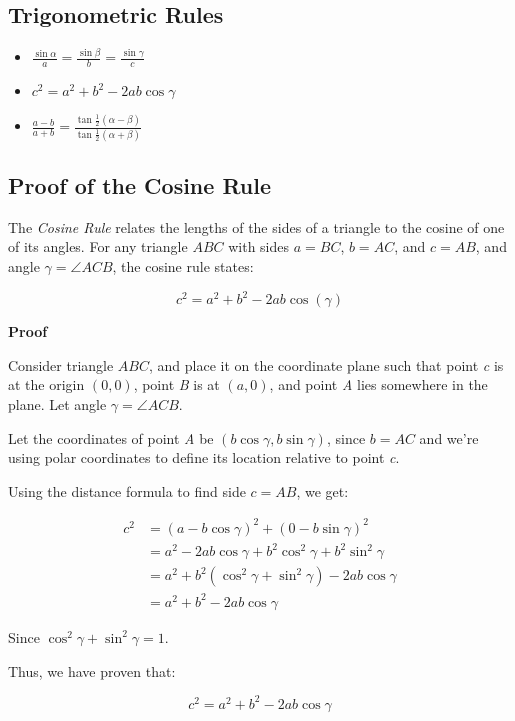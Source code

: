 \subsection{Trigonometric Rules}

\begin{itemize}

    \item \(\frac{\sin \alpha}{a} = \frac{\sin \beta}{b} = \frac{\sin \gamma}{c}\)

    \item \(c^2 = a^2 + b^2 - 2ab \cos \gamma\)

    \item \(\frac{a - b}{a + b} = \frac{\tan \frac{1}{2}(\alpha - \beta)}{\tan \frac{1}{2} (\alpha + \beta)}\)

\end{itemize}


\subsection{Proof of the Cosine Rule}

The \emph{Cosine Rule} relates the lengths of the sides of a triangle to the cosine of one of its angles. 
For any triangle \( ABC \) with sides \( a = BC \), \( b = AC \), and \( c = AB \), and angle 
\( \gamma = \angle ACB \), the cosine rule states:

\[
    c^2 = a^2 + b^2 - 2ab\cos(\gamma)
\]

\textbf{Proof}

Consider triangle \( ABC \), and place it on the coordinate plane such that point \emph{c} is at the origin
\( (0,0) \), point \emph{B} is at \( (a,0) \), and point \emph{A} lies somewhere in the plane. 
Let angle \( \gamma = \angle ACB \).
\vspace{\baselineskip}

Let the coordinates of point \emph{A} be \( (b\cos\gamma, b\sin\gamma) \), since \( b = AC \) and we’re 
using polar coordinates to define its location relative to point \emph{c}.
\vspace{\baselineskip}

Using the distance formula to find side \( c = AB \), we get:

\begin{align*}
    c^2 &= {(a - b\cos\gamma)}^2 + {(0 - b\sin\gamma)}^2 \\
    &= a^2 - 2ab\cos\gamma + b^2\cos^2\gamma + b^2\sin^2\gamma \\
    &= a^2 + b^2(\cos^2\gamma + \sin^2\gamma) - 2ab\cos\gamma \\
    &= a^2 + b^2 - 2ab\cos\gamma
\end{align*}

Since \( \cos^2\gamma + \sin^2\gamma = 1 \).
\vspace{\baselineskip}

Thus, we have proven that:

\[
    c^2 = a^2 + b^2 - 2ab\cos\gamma
\]

\QED